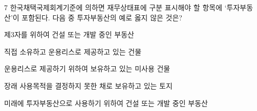 \begin{question}{7}
한국채택국제회계기준에 의하면 재무상태표에 구분 표시해야 할 항목에 ‘투자부동산’이 포함된다. 다음 중 투자부동산의 예로 옳지 않은 것은?
\begin{choices}
  \item 제3자를 위하여 건설 또는 개발 중인 부동산
  \item 직접 소유하고 운용리스로 제공하고 있는 건물
  \item 운용리스로 제공하기 위하여 보유하고 있는 미사용 건물
  \item 장래 사용목적을 결정하지 못한 채로 보유하고 있는 토지
  \item 미래에 투자부동산으로 사용하기 위하여 건설 또는 개발 중인 부동산
\end{choices}
\end{question}
